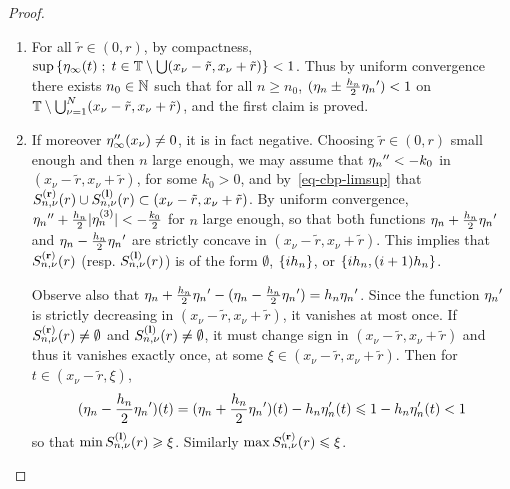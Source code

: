 \begin{proof}
   \begin{enumerate}
     \item  For all $\tilde{r}\in(0,r)$, by compactness, $\sup \left\{ \eta_\infty(t)  \;;\; t\in\mathbb{T}\setminus\bigcup (x_\nu-\tilde{r},x_\nu+\tilde{r}) \right\}<1$. Thus by uniform convergence there exists  $n_0\in \mathbb{N}$ such that for all $n\geq n_0$, $(\eta_n \pm \frac{{h_n}}{2}{\eta_n}')<1$ on $\mathbb{T}\setminus\bigcup_{\nu=1}^N (x_\nu-\tilde{r},x_\nu+\tilde{r})$, and the first claim is proved.

   \item If moreover $\eta_\infty''(x_\nu)\neq 0$, it is in fact negative. Choosing $\tilde{r}\in(0,r)$ small enough and then $n$ large enough, we may assume that ${\eta_n}'' <-k_0$ in $(x_\nu-\tilde{r},x_\nu+\tilde{r})$, for some $k_0>0$, and by~\eqref{eq-cbp-limsup} that $S_{n,\nu}^{\mathbf{(r)}}(r)\cup S_{n,\nu}^{\mathbf{(l)}}(r)\subset (x_{\nu}-\tilde{r},x_{\nu}+\tilde{r})$. By uniform convergence, ${\eta_n}''+\frac{{h_n}}{2}|\eta_n^{(3)}|<-\frac{k_0}{2}$ for $n$ large enough, so that both functions $\eta_n + \frac{{h_n}}{2}{\eta_n}'$ and $\eta_n - \frac{{h_n}}{2}{\eta_n}'$ are strictly concave in $(x_\nu-\tilde{r},x_\nu+\tilde{r})$. This implies that $S_{n,\nu}^{\mathbf{(r)}}(r)$ (resp. $S_{n,\nu}^{\mathbf{(l)}}(r)$) is of the form $\emptyset$, $\{i{h_n}\}$, or $\{i{h_n},(i+1){h_n}\}$.

     Observe also that $\eta_n + \frac{{h_n}}{2}{\eta_n}' -(\eta_n - \frac{{h_n}}{2}{\eta_n}')= {h_n}{\eta_n}'$.
     Since the function ${\eta_n}'$ is strictly decreasing in $(x_\nu-\tilde{r},x_\nu+\tilde{r})$, it vanishes at most once. If $S_{n,\nu}^{\mathbf{(r)}}(r)\neq\emptyset$ and $S_{n,\nu}^{\mathbf{(l)}}(r)\neq\emptyset$, it must change sign in $(x_\nu-\tilde{r},x_\nu+\tilde{r})$ and thus it vanishes exactly once, at some $\xi\in (x_\nu-\tilde{r},x_\nu+\tilde{r})$. 
Then for $t\in (x_\nu-\tilde{r},\xi)$, 
\begin{align*}
  (\eta_n - \frac{{h_n}}{2}{\eta_n}')(t)=(\eta_n + \frac{{h_n}}{2}{\eta_n}')(t)- {h_n} \eta_n'(t)\leqslant 1 - {h_n} \eta_n'(t)<1
\end{align*}
so that $\min S_{n,\nu}^{\mathbf{(l)}}(r)\geqslant\xi$. Similarly $\max S_{n,\nu}^{\mathbf{(r)}}(r)\leqslant \xi$.


\end{enumerate}
\end{proof}
